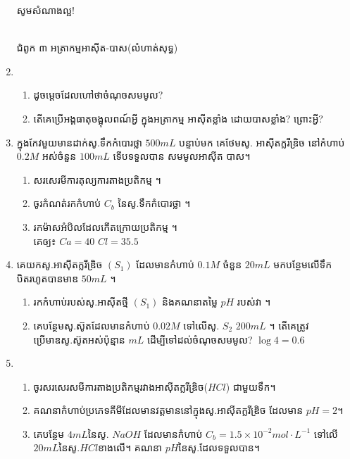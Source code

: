 \documentclass[12pt, a4paper]{article}
\begin{document}
\begin{enumerate}[m]
\begin{center}
		\sffamily\color{black}
		សូមសំណាងល្អ!
	\end{center}\newpage
	\begin{center}
		\sffamily\color{black}
		\\
		ជំពូក ៣ អត្រាកម្មអាស៊ីត-បាស(លំហាត់សុទ្ធ)
	\end{center}
	\item \begin{enumerate}[k]
		\item ដូចម្តេចដែលហៅថាចំណុចសមមូល?
		\item តើគេប្រើអង្គធាតុចង្អុលពណ៍អ្វី ក្នុងអត្រាកម្ម អាស៊ីតខ្លាំង ដោយបាសខ្លាំង? ព្រោះអ្វី?
	\end{enumerate}
	\item ក្នុងកែវមួយមានដាក់សូ.ទឹកកំបោរថ្លា $500mL$ បន្ទាប់មក គេថែមសូ. អាស៊ីតក្លរីឌ្រិច នៅកំហាប់ $0.2M$ អស់ចំនួន $100mL$ ទើបទទួលបាន សមមូលអាស៊ីត បាស។
	\begin{enumerate}[k]
		\item សរសេរមីការតុល្យការតាងប្រតិកម្ម ។
		\item ចូរកំណត់រកកំហាប់ $C_b$ នៃសូ.ទឹកកំបោរថ្លា ។
		\item រកម៉ាសអំបិលដែលកើតក្រោយប្រតិកម្ម ។\\
		គេឲ្យ៖ $Ca=40 $ $Cl=35.5$
	\end{enumerate}
	\item គេយកសូ.អាស៊ីតក្លរីឌ្រិច $(S_1)$ ដែលមានកំហាប់ $0.1M$ ចំនួន $20mL$ មកបន្ថែមលើទឹកបិតរហូតបានមាឌ $50mL$ ។
	\begin{enumerate}[k]
		\item រកកំហាប់របស់សូ.អាស៊ីតថ្មី $(S_1)$ និងគណនាតម្លៃ $pH$ របស់វា ។
		\item គេបន្ថែមសូ.ស៊ូតដែលមានកំហាប់ $0.02M$ ទៅលើសូ. $S_2$ $200mL$ ។ តើគេត្រូវប្រើមាឌសូ.ស៊ូតអស់ប៉ុន្មាន $mL$ ដើម្បីទៅដល់ចំណុចសមមូល? $\log4=0.6$
	\end{enumerate}
	\item \begin{enumerate}[k]
		\item ចូរសរសេរសមីការតាងប្រតិកម្មរវាងអាស៊ីតក្លរីឌ្រិច($HCl$) ជាមួយទឹក។
		\item គណនាកំហាប់ប្រភេទគីមីដែលមានវត្តមាននៅក្នុងសូ.អាស៊ីតក្លរីឌ្រិច ដែលមាន $pH=2$។
		\item គេបន្ថែម $4mL$នៃសូ. $NaOH$ ដែលមានកំហាប់ $C_b=1.5\times10^{-2}mol\cdot L^{-1}$ ទៅលើ $20mL$នៃសូ.$HCl$ខាងលើ។ គណនា $pH$នៃសូ.ដែលទទួលបាន។
	\end{enumerate}

\end{enumerate}
\end{document}
